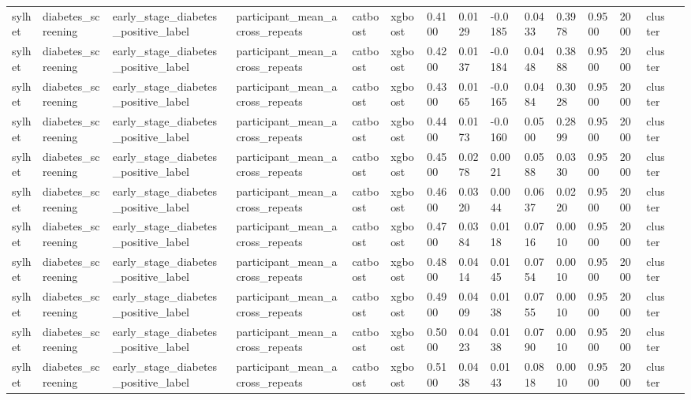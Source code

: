 \begin{tabular}{lllllllllllllll}
sylhet & diabetes\_screening & early\_stage\_diabetes\_positive\_label & participant\_mean\_across\_repeats & catboost & xgboost & 0.4100 & 0.0129 & -0.0185 & 0.0433 & 0.3978 & 0.9500 & 2000 & cluster &  \\
sylhet & diabetes\_screening & early\_stage\_diabetes\_positive\_label & participant\_mean\_across\_repeats & catboost & xgboost & 0.4200 & 0.0137 & -0.0184 & 0.0448 & 0.3888 & 0.9500 & 2000 & cluster &  \\
sylhet & diabetes\_screening & early\_stage\_diabetes\_positive\_label & participant\_mean\_across\_repeats & catboost & xgboost & 0.4300 & 0.0165 & -0.0165 & 0.0484 & 0.3028 & 0.9500 & 2000 & cluster &  \\
sylhet & diabetes\_screening & early\_stage\_diabetes\_positive\_label & participant\_mean\_across\_repeats & catboost & xgboost & 0.4400 & 0.0173 & -0.0160 & 0.0500 & 0.2899 & 0.9500 & 2000 & cluster &  \\
sylhet & diabetes\_screening & early\_stage\_diabetes\_positive\_label & participant\_mean\_across\_repeats & catboost & xgboost & 0.4500 & 0.0278 & 0.0021 & 0.0588 & 0.0330 & 0.9500 & 2000 & cluster &  \\
sylhet & diabetes\_screening & early\_stage\_diabetes\_positive\_label & participant\_mean\_across\_repeats & catboost & xgboost & 0.4600 & 0.0320 & 0.0044 & 0.0637 & 0.0220 & 0.9500 & 2000 & cluster &  \\
sylhet & diabetes\_screening & early\_stage\_diabetes\_positive\_label & participant\_mean\_across\_repeats & catboost & xgboost & 0.4700 & 0.0384 & 0.0118 & 0.0716 & 0.0010 & 0.9500 & 2000 & cluster &  \\
sylhet & diabetes\_screening & early\_stage\_diabetes\_positive\_label & participant\_mean\_across\_repeats & catboost & xgboost & 0.4800 & 0.0414 & 0.0145 & 0.0754 & 0.0010 & 0.9500 & 2000 & cluster &  \\
sylhet & diabetes\_screening & early\_stage\_diabetes\_positive\_label & participant\_mean\_across\_repeats & catboost & xgboost & 0.4900 & 0.0409 & 0.0138 & 0.0755 & 0.0010 & 0.9500 & 2000 & cluster &  \\
sylhet & diabetes\_screening & early\_stage\_diabetes\_positive\_label & participant\_mean\_across\_repeats & catboost & xgboost & 0.5000 & 0.0423 & 0.0138 & 0.0790 & 0.0010 & 0.9500 & 2000 & cluster &  \\
sylhet & diabetes\_screening & early\_stage\_diabetes\_positive\_label & participant\_mean\_across\_repeats & catboost & xgboost & 0.5100 & 0.0438 & 0.0143 & 0.0818 & 0.0010 & 0.9500 & 2000 & cluster &  \\

\end{tabular}
